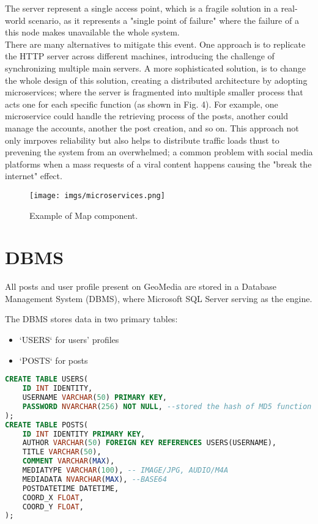 \documentclass[conference]{IEEEtran}
\begin{document}
The server represent a single access point, which is a fragile solution in a real-world scenario, as it represents a "single point of failure" where the failure of a this node makes unavailable the whole system.
\\
There are many alternatives to mitigate this event. One approach is to replicate the HTTP server across different machines, introducing the challenge of synchronizing multiple main servers.
A more sophisticated solution, is to change the whole design of this solution, creating a distributed architecture by adopting microservices\cite{b6}; where the server is fragmented into multiple smaller process that acts one for each specific function (as shown in Fig. 4).
For example, one microservice could handle the retrieving process of the posts, another could manage the accounts, another the post creation, and so on. This approach not only imrpoves reliability but also helps to distribute traffic loads thust to prevening the system from an overwhelmed; a common problem with social media platforms when a mass requests of a viral content happens causing the "break the internet" effect.


\begin{figure}[htbp]
\begin{center}
{\texttt{[image: imgs/microservices.png]}}
\end{center}
\caption{Example of Map component.}
\label{fig}
\end{figure}

\section{DBMS}

All posts and user profile present on GeoMedia are stored in a Database Management System (DBMS), where Microsoft SQL Server\cite{b7} serving as the engine.

The DBMS stores data in two primary tables:

\begin{itemize}
    \item `USERS` for users' profiles
    \item `POSTS` for posts 
\end{itemize}

\begin{lstlisting}[language=SQL, description=Creation of tables]
CREATE TABLE USERS(
    ID INT IDENTITY,
    USERNAME VARCHAR(50) PRIMARY KEY,
    PASSWORD NVARCHAR(256) NOT NULL, --stored the hash of MD5 function
);
CREATE TABLE POSTS(
	ID INT IDENTITY PRIMARY KEY,
	AUTHOR VARCHAR(50) FOREIGN KEY REFERENCES USERS(USERNAME),
	TITLE VARCHAR(50),
	COMMENT VARCHAR(MAX),
	MEDIATYPE VARCHAR(100), -- IMAGE/JPG, AUDIO/M4A
	MEDIADATA NVARCHAR(MAX), --BASE64
	POSTDATETIME DATETIME,
	COORD_X FLOAT,
	COORD_Y FLOAT,
);
\end{lstlisting}
\end{document}
